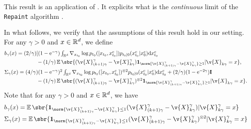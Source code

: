 \begin{theorem}
	\label{thm:convergence_repaint}
\end{theorem}

This result is an application of \textcite[Theorem 11.2.3]{stroock2007multidimensional}.
It explicits what is the \emph{continuous} limit of the \texttt{Repaint} algorithm \cite{lugmayr2022repaint}.

In what follows, we verify that the assumptions of this result hold in our setting.
For any $\gamma > 0$ and $x \in \mathbb{R}^d$, we define \begin{align}  & \textstyle b_\gamma(x) = (2/\gamma)[ (1- \mathrm{e}^{-\gamma}) \int_{\R^d} \nabla_{x_{t_0}} \log p_{t_0}([x_{t_0}, x_{t_0}^c]) p_{t_0|0}(x_{t_0}^c|x_0^c) \mathrm{d} x_{t_0}^c \\ &\qquad \qquad \qquad \textstyle - (1/\gamma) \E\sbr{(\v{X}_{(k+1)\gamma}^\gamma - \v{X}_{k \gamma}^\gamma)\mathbf{1}_{\norm{\v{X}_{(k+1)\gamma}^\gamma - \v{X}_{k \gamma}^\gamma} \geq 1} \vert \v{X}_{k \gamma} = x} , \\ &\textstyle \Sigma_\gamma(x) = (4/\gamma)(1- \mathrm{e}^{-\gamma})^2 \int_{\R^d} \nabla_{x_{t_0}} \log p_{t_0}([x_{t_0}, x_{t_0}^c])^{\otimes 2} p_{t_0|0}(x_{t_0}^c|x_0^c) \mathrm{d} x_{t_0}^c + (2/\gamma)(1- \mathrm{e}^{-2\gamma}) \m{I} \\ &\qquad \qquad \qquad \textstyle - (1/\gamma) \E\sbr{(\v{X}_{(k+1)\gamma}^\gamma - \v{X}_{k \gamma}^\gamma)^{\otimes 2}\mathbf{1}_{\norm{\v{X}_{(k+1)\gamma}^\gamma - \v{X}_{k \gamma}^\gamma} \geq 1} \vert \v{X}_{k \gamma} = x} .
\end{align}
Note that for any $\gamma > 0$ and $x \in \mathbb{R}^d$, we have \begin{align} &b_\gamma(x) = \E\sbr{\mathbf{1}_{\norm{\v{X}_{(k+1)\gamma}^\gamma - \v{X}_{k \gamma}^\gamma}\leq 1} (\v{X}_{(k+1)\gamma}^\gamma - \v{X}_{k \gamma}^\gamma) \vert \v{X}_{k \gamma}^\gamma = x} \\ &\Sigma_\gamma(x) =\E\sbr{\mathbf{1}_{\norm{\v{X}_{(k+1)\gamma}^\gamma - \v{X}_{k \gamma}^\gamma}\leq 1} (\v{X}_{(k+1)\gamma}^\gamma - \v{X}_{k \gamma}^\gamma)^{\otimes 2} \vert \v{X}_{k \gamma}^\gamma = x} \\ \end{align} 

